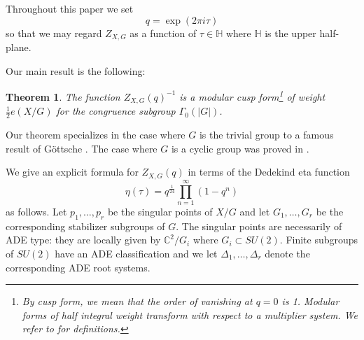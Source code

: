 \documentclass{article}
\newtheorem{theorem}{Theorem}[section]
\theoremstyle{definition}
\newcommand{\half}{\frac{1}{2}}
\newcommand{\CC} {{\mathbb C}}          %
\newcommand{\HH}{\mathbb{H}}
\begin{document}
Throughout this paper we set
\[
q=\exp\left(2\pi i \tau  \right)
\]
so that we may regard $Z_{X,G}$ as a function of $\tau \in \HH$ where
$\HH$ is the upper half-plane.

Our main result is the following:

\begin{theorem}
\label{thm:main} The function $Z_{X,G}(q)^{-1}$ is a modular cusp
form\footnote{By cusp form, we mean that the order of vanishing at
$q=0$ is 1. Modular forms of half integral weight transform with
respect to a multiplier system. We refer to \cite{kohler2011eta} for
definitions.} of weight $\half e(X/G)$ for the congruence subgroup
$\Gamma_{0}(|G|)$.
\end{theorem}
   

Our theorem specializes in the case where $G$ is the trivial group to
a famous result of G\"ottsche \cite{gottsche1990betti}. The case where
$G$ is a cyclic group was proved in \cite{bryan2018chl}.


We give an explicit formula for $Z_{X,G}(q)$ in terms of the
Dedekind eta function
\[
\eta (\tau ) = q^{\frac{1}{24}}\prod_{n=1}^{\infty} (1-q^{n})
\]
as follows. Let $p_{1},\dots ,p_{r}$ be the singular points of $X/G$
and let $G_{1},\dots ,G_{r}$ be the corresponding stabilizer subgroups
of $G$. The singular points are necessarily of ADE type: they are
locally given by $\CC^{2}/G_{i}$ where $G_{i}\subset SU(2)$. Finite
subgroups of $SU(2)$ have an ADE classification and we let
$\Delta_{1},\dots ,\Delta_{r}$ denote the corresponding ADE root
systems.
\end{document}
